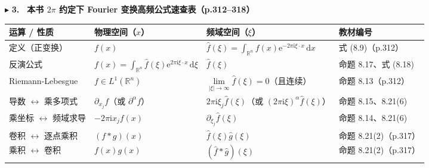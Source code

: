 \documentclass[11pt,a4paper]{article}
\newcounter{none}
\newcommand{\FastBadge}{%
  \tcbox[on line, colback=AccentSoft, colframe=AccentMain!45!BorderColor, boxrule=0.35pt,
    arc=3pt, left=3.5pt, right=3.5pt, top=0.5pt, bottom=0.5pt, boxsep=0pt]{\scriptsize\bfseries\color{AccentMain}速通}\,%
}
\newcommand{\SubSubHeading}[1]{%
  \Needspace{6.5\baselineskip}\vspace{5.5pt}\noindent
  \textcolor{AccentMain}{\scriptsize$\blacktriangleright$}\hspace{4pt}%
  {\small\bfseries\color{AccentMain}#1}\par\nopagebreak[4]\vspace{2.5pt}%
}
\begin{document}
\SubSubHeading{3. \FastBadge{} 本书 \(2\pi\) 约定下 Fourier 变换高频公式速查表（p.312--318）}

{\def\LTcaptype{none} %
{\small\renewcommand{\arraystretch}{1.38}\setlength{\tabcolsep}{5pt}
\begin{longtable}[]{@{}
  >{\raggedright\arraybackslash}p{}
  >{\raggedright\arraybackslash}p{}
  >{\raggedright\arraybackslash}p{}
  >{\raggedright\arraybackslash}p{}@{}}
\toprule\noalign{}
\rowcolor{AccentSoft}
\begin{minipage}[b]{\linewidth}\raggedright
运算 / 性质
\end{minipage} & \begin{minipage}[b]{\linewidth}\raggedright
物理空间（\(x\)）
\end{minipage} & \begin{minipage}[b]{\linewidth}\raggedright
频域空间（\(\xi\)）
\end{minipage} & \begin{minipage}[b]{\linewidth}\raggedright
教材编号
\end{minipage} \\
\midrule\noalign{}
\endhead
\bottomrule\noalign{}
\endlastfoot
定义（正变换） & \(f(x)\) & \(\hat{f}(\xi) = \displaystyle\int_{\mathbb{R}^n} f(x)\mathrm{e}^{-2\pi\mathrm{i}\xi\cdot x}\,\mathrm{d}x\) & 式 (8.9)（p.312） \\
反演公式 & \(f(x) = \displaystyle\int_{\mathbb{R}^n} \hat{f}(\xi)\mathrm{e}^{2\pi\mathrm{i}\xi\cdot x}\,\mathrm{d}\xi\) & \(\hat{f}(\xi)\) & 命题 8.17、式 (8.18) \\
Riemann-Lebesgue & \(f \in L^1(\mathbb{R}^n)\) & \(\lim\limits_{\lvert\xi\rvert\to\infty}\hat{f}(\xi) = 0\)（且连续） & 命题 8.13（p.312） \\
导数 \(\leftrightarrow\) 乘多项式 & \(\partial_{x_j} f\)（或 \(\partial^\alpha f\)） & \(2\pi\mathrm{i}\xi_j \hat{f}(\xi)\)（或 \((2\pi\mathrm{i}\xi)^\alpha \hat{f}(\xi)\)） & 命题 8.15、8.21(6) \\
乘坐标 \(\leftrightarrow\) 频域求导 & \(-2\pi\mathrm{i}x_j f(x)\) & \(\partial_{\xi_j}\hat{f}(\xi)\) & 命题 8.14、8.21(6) \\
卷积 \(\leftrightarrow\) 逐点乘积 & \((f * g)(x)\) & \(\hat{f}(\xi)\hat{g}(\xi)\) & 命题 8.21(2)（p.317） \\
乘积 \(\leftrightarrow\) 卷积 & \(f(x)g(x)\) & \((\hat{f} * \hat{g})(\xi)\) & 命题 8.21(2)（p.317） \\

\end{longtable}}}
\end{document}
